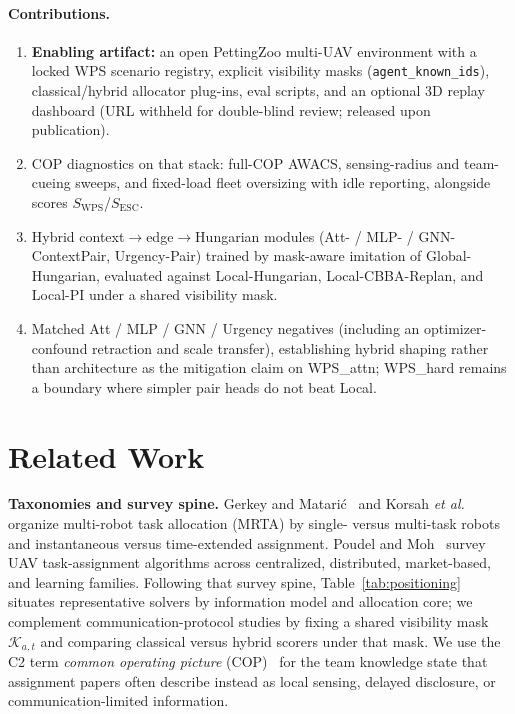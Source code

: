 \documentclass[journal,twocolumn,10pt]{IEEEtran}
\begin{document}
\paragraph{Contributions.}
\begin{enumerate}
  \item \textbf{Enabling artifact:} an open PettingZoo multi-UAV environment with a locked WPS scenario registry, explicit visibility masks (\texttt{agent\_known\_ids}), classical/hybrid allocator plug-ins, eval scripts, and an optional 3D replay dashboard (URL withheld for double-blind review; released upon publication).
  \item COP diagnostics on that stack: full-COP AWACS, sensing-radius and team-cueing sweeps, and fixed-load fleet oversizing with idle reporting, alongside scores \(S_{\mathrm{WPS}}\)/\(S_{\mathrm{ESC}}\).
  \item Hybrid context$\rightarrow$edge$\rightarrow$Hungarian modules (Att- / MLP- / GNN-ContextPair, Urgency-Pair) trained by mask-aware imitation of Global-Hungarian, evaluated against Local-Hungarian, Local-CBBA-Replan, and Local-PI under a shared visibility mask.
  \item Matched Att / MLP / GNN / Urgency negatives (including an optimizer-confound retraction and scale transfer), establishing hybrid shaping rather than architecture as the mitigation claim on WPS\_attn; WPS\_hard remains a boundary where simpler pair heads do not beat Local.
\end{enumerate}

\section{Related Work}
\textbf{Taxonomies and survey spine.}
Gerkey and Matari{\'c}~\cite{gerkey2004formal} and Korsah \emph{et al.}~\cite{korsah2013comprehensive} organize multi-robot task allocation (MRTA) by single- versus multi-task robots and instantaneous versus time-extended assignment.
Poudel and Moh~\cite{poudel2022survey} survey UAV task-assignment algorithms across centralized, distributed, market-based, and learning families.
Following that survey spine, Table~\ref{tab:positioning} situates representative solvers by information model and allocation core; we complement communication-protocol studies by fixing a shared visibility mask \(\mathcal{K}_{a,t}\) and comparing classical versus hybrid scorers under that mask.
We use the C2 term \emph{common operating picture} (COP)~\cite{mcneese2006cop,yu2023cop} for the team knowledge state that assignment papers often describe instead as local sensing, delayed disclosure, or communication-limited information.
\end{document}
